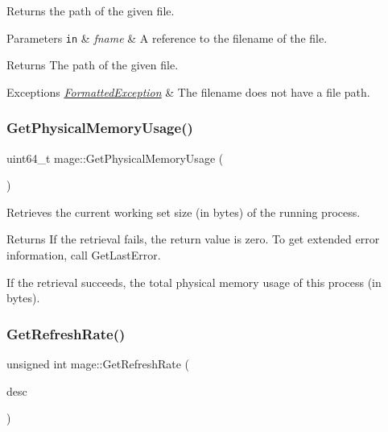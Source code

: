 Returns the path of the given file.


\begin{DoxyParams}[1]{Parameters}
\mbox{\tt in}  & {\em fname} & A reference to the filename of the file. \\
\hline
\end{DoxyParams}
\begin{DoxyReturn}{Returns}
The path of the given file. 
\end{DoxyReturn}

\begin{DoxyExceptions}{Exceptions}
{\em \hyperlink{structmage_1_1_formatted_exception}{Formatted\+Exception}} & The filename does not have a file path. \\
\hline
\end{DoxyExceptions}
\hypertarget{namespacemage_ad86bf56ff188b6519ddc0f0df8eaac20}{}\label{namespacemage_ad86bf56ff188b6519ddc0f0df8eaac20} 
\subsubsection{\texorpdfstring{Get\+Physical\+Memory\+Usage()}{GetPhysicalMemoryUsage()}}
{\footnotesize\ttfamily uint64\+\_\+t mage\+::\+Get\+Physical\+Memory\+Usage (\begin{DoxyParamCaption}{ }\end{DoxyParamCaption})}

Retrieves the current working set size (in bytes) of the running process.

\begin{DoxyReturn}{Returns}
If the retrieval fails, the return value is zero. To get extended error information, call Get\+Last\+Error. 

If the retrieval succeeds, the total physical memory usage of this process (in bytes). 
\end{DoxyReturn}
\hypertarget{namespacemage_a9b8c2b3062e4362172269563a9a7c569}{}\label{namespacemage_a9b8c2b3062e4362172269563a9a7c569} 
\subsubsection{\texorpdfstring{Get\+Refresh\+Rate()}{GetRefreshRate()}}
{\footnotesize\ttfamily unsigned int mage\+::\+Get\+Refresh\+Rate (\begin{DoxyParamCaption}\item[{const D\+X\+G\+I\+\_\+\+M\+O\+D\+E\+\_\+\+D\+E\+S\+C1 \&}]{desc }\end{DoxyParamCaption})}

